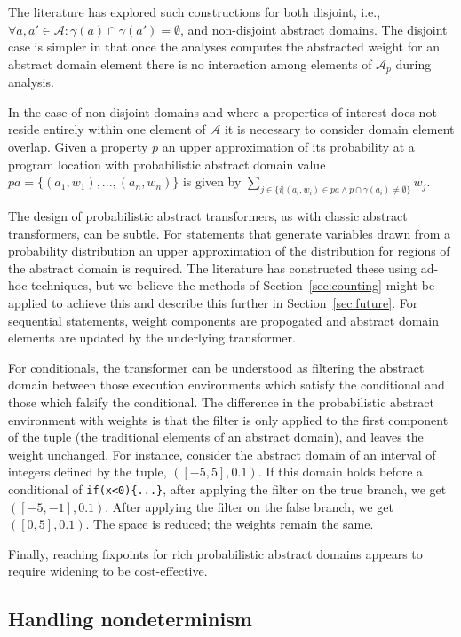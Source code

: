 The literature has explored such constructions for both
disjoint, i.e., $\forall a,a' \in \mathcal{A} : 
\gamma(a) \cap \gamma(a') = \emptyset$, and non-disjoint abstract domains.
The disjoint case is simpler in that once the analyses computes
the abstracted weight for an abstract domain element there is
no interaction among elements of $\mathcal{A}_p$ during analysis.

In the case of non-disjoint domains and where a properties of interest
does not reside entirely within one element of $\mathcal{A}$ it is
necessary to consider domain element overlap. 
Given a property $p$ an upper approximation of its probability 
at a program location with probabilistic abstract domain
value $pa = \{(a_1,w_1), ..., (a_n,w_n)\}$
is given by $\sum_{j \in \{ i \vert (a_i,w_i) \in pa \wedge   
p \cap \gamma(a_i) \not= \emptyset\}} w_j$.

The design of probabilistic abstract transformers, as with 
classic abstract transformers, can be subtle.
For statements that generate variables drawn from a probability
distribution an upper approximation of the distribution for
regions of the abstract domain is required.  The literature
has constructed these using ad-hoc techniques, but we believe
the methods of Section~\ref{sec:counting} might be applied to 
achieve this and describe this further in Section~\ref{sec:future}.
For sequential statements, weight components are propogated
and abstract domain elements are updated by the underlying transformer.

For conditionals, the transformer can be understood
as filtering the abstract domain between those execution environments which
satisfy the conditional and those which falsify the conditional. 
The difference in the probabilistic abstract environment with weights 
is that the filter is only applied to the first component of
the tuple (the traditional elements of an abstract domain), 
and leaves the weight unchanged.
For instance, consider the abstract domain of an interval of 
integers defined by the tuple, $([-5,5],0.1)$. 
If this domain holds before a conditional of 
{\tt if(x<0)\{...\}}, after applying the filter on the true branch, 
we get $([-5,-1],0.1)$. 
After applying the filter on the false branch, we get $([0,5],0.1)$.
The space is reduced; the weights remain the same.

Finally, reaching fixpoints for rich probabilistic abstract domains
appears to require widening \cite{Monniaux,Esparza:SAS11} to be
cost-effective.

\subsection{Handling nondeterminism}

